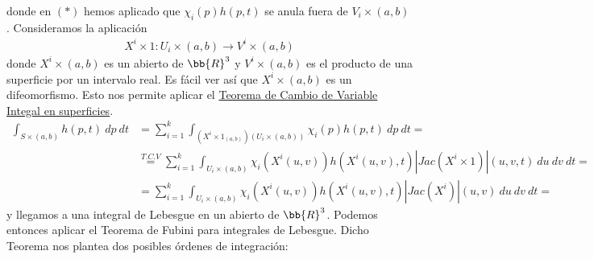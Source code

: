 donde en $(\ast)$ hemos aplicado que $\chi_i(p)h(p,t)$ se anula fuera de $V_i\times(a,b)$. Consideramos la aplicación
\begin{gather*}
    X^i\times 1: U_i\times (a,b) \to V^i\times(a,b)
\end{gather*}
donde $X^i \times(a,b)$ es un abierto de $\bb{R}^3$ y $V^i\times (a,b)$ es el producto de una superficie por un intervalo real. Es fácil ver así que $X^i\times(a,b)$ es un difeomorfismo. Esto nos permite aplicar el \hyperref[teo:cambio_variable_integral_sup]{Teorema de Cambio de Variable Integal en superficies}.
\begin{align*}
    \int_{S\times(a,b)} h(p,t)\ dp\ dt &= 
    \sum_{i=1}^k \int_{(X^i\times 1_{(a,b)})(U_i\times(a,b))} \chi_i(p)h(p,t)\ dp\ dt =\\
    &\overset{T.C.V}{=}
    \sum_{i=1}^k \int_{U_i\times(a,b)} \chi_i(X^i(u,v))h(X^i(u,v), t) |Jac(X^i \times 1)|(u,v,t)\ du\ dv\ dt =\\
    &=
    \sum_{i=1}^k \int_{U_i\times(a,b)} \chi_i(X^i(u,v))h(X^i(u,v), t) |Jac(X^i)|(u,v)\ du\ dv\ dt =
\end{align*}
y llegamos a una integral de Lebesgue en un abierto de $\bb{R}^3$. Podemos entonces aplicar el Teorema de Fubini para integrales de Lebesgue. Dicho Teorema nos plantea dos posibles órdenes de integración:
